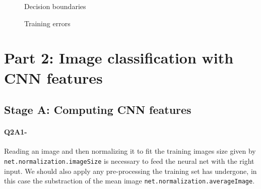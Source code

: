 \documentclass[11pt]{article}
\newcommand{\1}{\mathbbm{1}}
\newcommand{\0}{\mathbf{0}}
\begin{document}
		\begin{figure}[H]
			\centering
			\caption{Decision boundaries}
		\end{figure}
		\begin{figure}[H]
		\ContinuedFloat
		\centering
		\end{figure}
		\begin{figure}[H]
		\caption{Training errors}
			\centering
		\end{figure}
		\begin{figure}[H]
		\ContinuedFloat
		\centering
		\end{figure}
		
\section*{Part 2: Image classification with CNN features}
\subsection*{Stage A: Computing CNN features}
	\paragraph{Q2A1-}
		Reading an image and then normalizing it to fit the training images size given by \texttt{net.normalization.imageSize} is necessary to feed the neural net with the right input. We should also apply any pre-processing the training set has undergone, in this case the substraction of the mean image \texttt{net.normalization.averageImage}.
\end{document}
